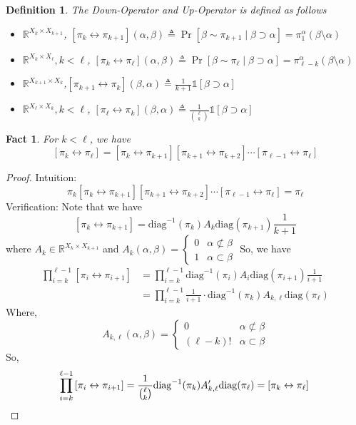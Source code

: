 \documentclass{article}
\newtheorem{define}{Definition}[section]
\newtheorem{fact}{Fact}[section]
\def\Op#1#2{\left[#1 \leftrightarrow #2\right]}
\begin{document}
\begin{define} The Down-Operator and Up-Operator is defined as follows
  \begin{itemize}
  \item$\mathbb{R}^{X_k \times X_{k+1}}$, $\Op{\pi_k}{\pi_{k+1}}(\alpha, \beta)  \triangleq \Pr[\beta\sim \pi_{k+1} \;|\; \beta\supset\alpha] = \pi^\alpha_1(\beta\setminus\alpha)$
  \item$\mathbb{R}^{X_k \times X_{\ell}}, k < \ell$, $\Op{\pi_k}{\pi_\ell}(\alpha, \beta) \triangleq \Pr[\beta\sim\pi_{\ell} \;|\; \beta\supset\alpha] = \pi^\alpha_{\ell-k}(\beta\setminus \alpha)$
  \item$\mathbb{R}^{X_{k+1} \times X_{k}}$,$\Op{\pi_{k+1}}{\pi_k}(\beta, \alpha) \triangleq \frac{1}{k+1} \mathbb{1}[\beta\supset\alpha]$
  \item$\mathbb{R}^{X_\ell \times X_k}, k < \ell$, $\Op{\pi_\ell}{\pi_k}(\beta, \alpha) \triangleq \frac{1}{\binom{\ell}{k}}\mathbb{1}[\beta\supset\alpha]$
  \end{itemize}
\end{define}

\begin{fact}
  For $k < \ell$, we have
  \[\Op{\pi_k}{\pi_\ell} = \Op{\pi_k}{\pi_{k+1}}\Op{\pi_{k+1}}{\pi_{k+2}}\cdots\Op{\pi_{\ell-1}}{\pi_\ell}\]
\end{fact}
\begin{proof}
  Intuition:
  \[\pi_k\Op{\pi_k}{\pi_{k+1}}\Op{\pi_{k+1}}{\pi_{k+2}}\cdots\Op{\pi_{\ell-1}}{\pi_\ell} = \pi_\ell\]
  Verification:
  Note that we have
  \[\Op{\pi_k}{\pi_{k+1}} = \mathrm{diag}^{-1}(\pi_k) A_k \mathrm{diag}(\pi_{k+1}) \frac{1}{k+1}\]
  where $A_k \in \mathbb{R}^{X_k\times X_{k+1}}$ and
  $A_k(\alpha, \beta) = \left\{
    \begin{array}{ll}
      0 & \alpha \not\subset \beta \\
      1 & \alpha \subset \beta
    \end{array}
  \right.$
  So, we have
  \begin{align*}
    \prod_{i=k}^{\ell-1}\Op{\pi_i}{\pi_{i+1}} 
    &= \prod_{i=k}^{\ell-1}\mathrm{diag}^{-1}(\pi_i)A_i\mathrm{diag}(\pi_{i+1})\frac{1}{i+1}\\
    &= \prod_{i=k}^{\ell-1}\frac{1}{i+1} \cdot \mathrm{diag}^{-1}(\pi_k) A_{k,\ell} \mathrm{diag}(\pi_\ell)
  \end{align*}
  Where, 
  \[A_{k,\ell}(\alpha, \beta) = \left\{
    \begin{array}{ll}
      0 & \alpha\not\subset\beta \\
      (\ell - k)! & \alpha \subset\beta
    \end{array}
  \right.\]
  So, 
  \[\prod_{i=k}^{\ell-1}\Op{\pi_i}{\pi_{i+1}} = \frac{1}{\binom{\ell}{k}} \mathrm{diag}^{-1}(\pi_k) A'_{k,\ell} \mathrm{diag}(\pi_\ell) = \Op{\pi_k}{\pi_\ell} \qedhere\]
\end{proof}
\end{document}
